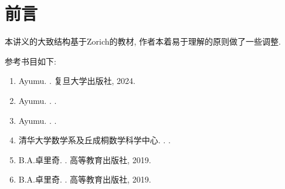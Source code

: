 \chapter*{前言}

本讲义的大致结构基于Zorich的教材, 作者本着易于理解的原则做了一些调整. 

参考书目如下: 

\begin{enumerate}

\item
Ayumu.
.
\newblock 复旦大学出版社, 2024.

\item
Ayumu.
.
.

\item
Ayumu.
.
.

\item
清华大学数学系及丘成桐数学科学中心.
.
.

\item
B.A.卓里奇.
.
\newblock 高等教育出版社, 2019.

\item
B.A.卓里奇.
.
\newblock 高等教育出版社, 2019.

\end{enumerate}

